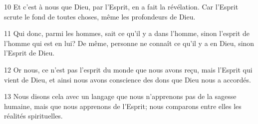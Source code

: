 
10 Et c’est à nous que Dieu, par l’Esprit, en a fait la révélation. Car l’Esprit scrute le fond de toutes choses, même les profondeurs de Dieu.

11 Qui donc, parmi les hommes, sait ce qu’il y a dans l’homme, sinon l’esprit de l’homme qui est en lui? De même, personne ne connaît ce qu’il y a en Dieu, sinon l’Esprit de Dieu.

12 Or nous, ce n’est pas l’esprit du monde que nous avons reçu, mais l’Esprit qui vient de Dieu, et ainsi nous avons conscience des dons que Dieu nous a accordés.

13 Nous disons cela avec un langage que nous n’apprenons pas de la sagesse humaine, mais que nous apprenons de l’Esprit; nous comparons entre elles les réalités spirituelles.